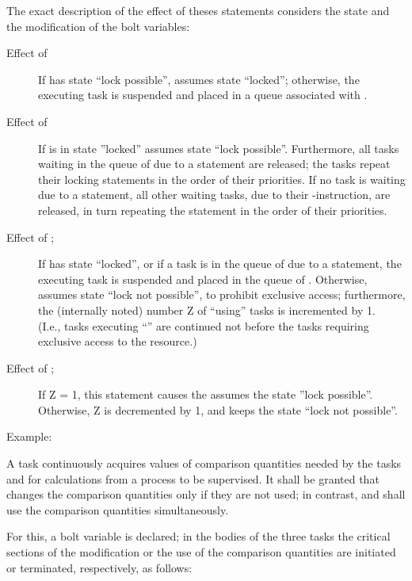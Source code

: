 The exact description of the effect of theses statements considers the
state and the modification of the bolt variables:
\begin{description}
\item[Effect of ]
If  has state ``lock possible'',  assumes state ``locked''; otherwise,
the executing task is suspended and placed in a queue associated with .
\item[Effect of ]
If  is in state ''locked''  assumes state ``lock possible''. Furthermore, all tasks waiting in the
queue of  due to a  statement are released; the tasks repeat
their locking statements in the order of their priorities. If no task
is waiting due to a  statement, all other waiting tasks, due to 
their -instruction, are released, in turn repeating the  
statement in the order of their priorities.

\item[Effect of ;]
If  has state ``locked'', or if a task is in the queue of  due to a
 statement, the executing task is suspended and placed in the
queue of . Otherwise,  assumes state ``lock not possible'', to prohibit
exclusive access; furthermore, the (internally noted) number Z of
``using'' tasks is incremented by 1.\\
(I.e., tasks executing ``'' are continued not before the tasks
requiring exclusive access to the resource.)
\item[Effect of ;]
If Z = 1, this statement causes the  assumes the state ''lock possible''.
Otherwise, Z is decremented by 1, and  keeps the state ``lock not
possible''.
\end{description}

 
Example:

A task  continuously acquires values of comparison
quantities needed by the tasks  and  for
calculations from a process to be supervised. It shall be granted that
 changes the comparison quantities only if they are not
used; in contrast,  and  shall use the
comparison quantities simultaneously.

For this, a bolt variable  is declared; in the bodies of the three
tasks the critical sections of the modification or the use of the
comparison quantities are initiated or terminated, respectively, as
follows:

